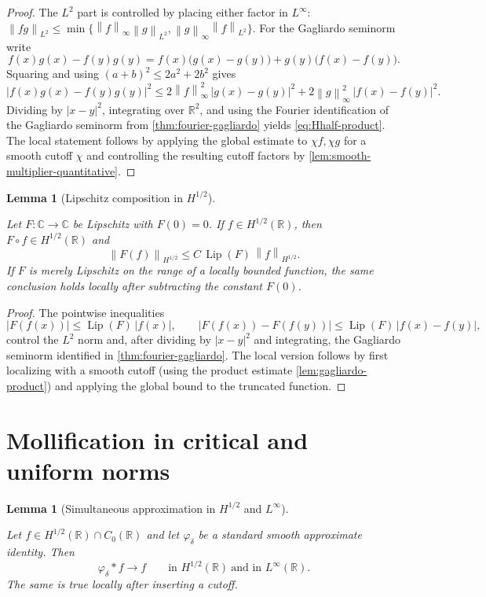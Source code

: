 \documentclass[11pt,oneside]{book}
\providecommand{\uses}[1]{}
\newtheorem{lemma}[theorem]{Lemma}
\theoremstyle{definition}
\theoremstyle{remark}
\newcommand{\R}{\mathbb R}
\newcommand{\C}{\mathbb C}
\newcommand{\1}{\mathbf 1}
\newcommand{\norm}[1]{\left\lVert #1\right\rVert}
\begin{document}
\begin{proof}
\uses{thm:fourier-gagliardo, lem:smooth-multiplier-quantitative}
The $L^2$ part is controlled by placing either factor in $L^\infty$:
$\norm{fg}_{L^2}\le\min\{\norm{f}_\infty\norm{g}_{L^2},\norm{g}_\infty\norm{f}_{L^2}\}$.
For the Gagliardo seminorm write
\[
 f(x)g(x)-f(y)g(y)
 =f(x)\bigl(g(x)-g(y)\bigr)+g(y)\bigl(f(x)-f(y)\bigr).
\]
Squaring and using $(a+b)^2\le 2a^2+2b^2$ gives
\[
 |f(x)g(x)-f(y)g(y)|^2
 \le 2\norm{f}_\infty^2\,|g(x)-g(y)|^2
   +2\norm{g}_\infty^2\,|f(x)-f(y)|^2 .
\]
Dividing by $|x-y|^2$, integrating over $\R^2$, and using the Fourier identification of the Gagliardo seminorm from \cref{thm:fourier-gagliardo} yields \eqref{eq:Hhalf-product}. The local statement follows by applying the global estimate to $\chi f,\chi g$ for a smooth cutoff $\chi$ and controlling the resulting cutoff factors by \cref{lem:smooth-multiplier-quantitative}.
\end{proof}

\begin{lemma}[Lipschitz composition in $H^{1/2}$]\label{lem:lipschitz-composition}
\uses{def:Hs-space}
Let $F:\C\to\C$ be Lipschitz with $F(0)=0$. If $f\in H^{1/2}(\R)$, then $F\circ f\in H^{1/2}(\R)$ and
\[
 \norm{F(f)}_{H^{1/2}}\le C\,\operatorname{Lip}(F)\,\norm{f}_{H^{1/2}}.
\]
If $F$ is merely Lipschitz on the range of a locally bounded function, the same conclusion holds locally after subtracting the constant $F(0)$.
\end{lemma}

\begin{proof}
\uses{thm:fourier-gagliardo, lem:gagliardo-product}
The pointwise inequalities
\[
 |F(f(x))|\le\operatorname{Lip}(F)\,|f(x)|,
 \qquad
 |F(f(x))-F(f(y))|\le\operatorname{Lip}(F)\,|f(x)-f(y)|,
\]
control the $L^2$ norm and, after dividing by $|x-y|^2$ and integrating, the Gagliardo seminorm identified in \cref{thm:fourier-gagliardo}. The local version follows by first localizing with a smooth cutoff (using the product estimate \cref{lem:gagliardo-product}) and applying the global bound to the truncated function.
\end{proof}

\section{Mollification in critical and uniform norms}

\begin{lemma}[Simultaneous approximation in $H^{1/2}$ and $L^\infty$]\label{lem:mollification-critical-uniform}
\uses{def:Hs-space, def:fourier-convention}
Let $f\in H^{1/2}(\R)\cap C_0(\R)$ and let $\varphi_\delta$ be a standard smooth approximate identity. Then
\[
 \varphi_\delta*f\longrightarrow f
 \qquad\text{in }H^{1/2}(\R)\ \text{and in }L^\infty(\R).
\]
The same is true locally after inserting a cutoff.
\end{lemma}
\end{document}
